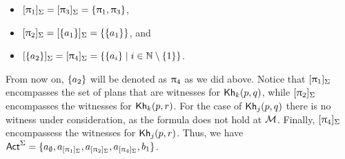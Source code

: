 \begin{example}
\begin{itemize}
    \item $[\uppi_1]_\Sigma = [\uppi_3]_\Sigma = \{ \uppi_1,\uppi_3 \}$,
    \item $[\uppi_2]_\Sigma = [\{ a_1 \}]_\Sigma= \{ \{ a_1 \} \}$, and 
    \item $[\{ a_2 \}]_\Sigma = [\uppi_4]_\Sigma = \{ \{ a_i \} \mid i \in \mathbb{N}\setminus\{ 1 \} \}$.
\end{itemize}

From now on, $\{ a_2 \}$ will be denoted as $\uppi_4$ as we did above. 
Notice that $[\uppi_1]_\Sigma$ encompasses the set of plans that are witnesses for ${\sf Kh}_k(p,q)$, while $[\uppi_2]_\Sigma$ encompasses the witnesses for ${\sf Kh}_k(p,r)$. For the case of ${\sf Kh}_j(p,q)$ there is no witness under consideration, as the formula does not hold at $\mathcal{M}$.   
Finally, $[\uppi_4]_\Sigma$ encompassess the witnesses for ${\sf Kh}_j(p,r)$. Thus, we have ${\rm \sf Act}^\Sigma =\{ a_\emptyset,a_{[\uppi_1]_\Sigma},a_{[\uppi_2]_\Sigma},a_{[\uppi_4]_\Sigma},b_1 \}$.


\end{example}
